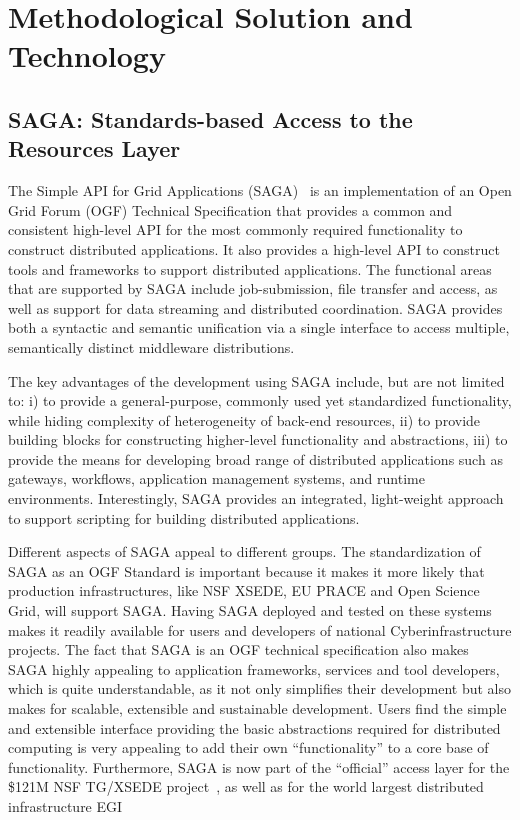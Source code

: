\documentclass{sig-alternate}
\begin{document}
\section{Methodological Solution and Technology}


\subsection{SAGA: Standards-based Access to the Resources Layer}

The Simple API for Grid Applications (SAGA)~\cite{saga_url} is an
implementation of an Open Grid Forum (OGF) Technical Specification
that provides a common and consistent high-level API for the most
commonly required functionality to construct distributed applications.
It also provides a high-level API to construct tools and frameworks to
support distributed applications. The functional areas that are
supported by SAGA include job-submission, file transfer and access, as
well as support for data streaming and distributed coordination. SAGA
provides both a syntactic and semantic unification via a single
interface to access multiple, semantically distinct middleware
distributions.


The key advantages of the development using SAGA include, but are not
limited to: i) to provide a general-purpose, commonly used yet
standardized functionality, while hiding complexity of heterogeneity
of back-end resources, ii) to provide building blocks for constructing
higher-level functionality and abstractions, iii) to provide the means
for developing broad range of distributed applications such as
gateways, workflows, application management systems, and runtime
environments. Interestingly, SAGA provides an integrated, light-weight
approach to support scripting for building distributed applications.

Different aspects of SAGA appeal to different groups. The
standardization of SAGA as an OGF Standard is important because it
makes it more likely that production infrastructures, like NSF XSEDE,
EU PRACE and Open Science Grid, will support SAGA. Having SAGA
deployed and tested on these systems makes it readily available for
users and developers of national Cyberinfrastructure projects. The
fact that SAGA is an OGF technical specification also makes SAGA
highly appealing to application frameworks, services and tool
developers, which is quite understandable, as it not only simplifies
their development but also makes for scalable, extensible and
sustainable development. Users find the simple and extensible
interface providing the basic abstractions required for distributed
computing is very appealing to add their own ``functionality'' to a
core base of functionality. Furthermore, SAGA is now part of the
``official'' access layer for the \$121M NSF TG/XSEDE
project~\cite{XSEDE}, as well as for the world largest distributed
infrastructure EGI~\cite{EGI}
\end{document}
